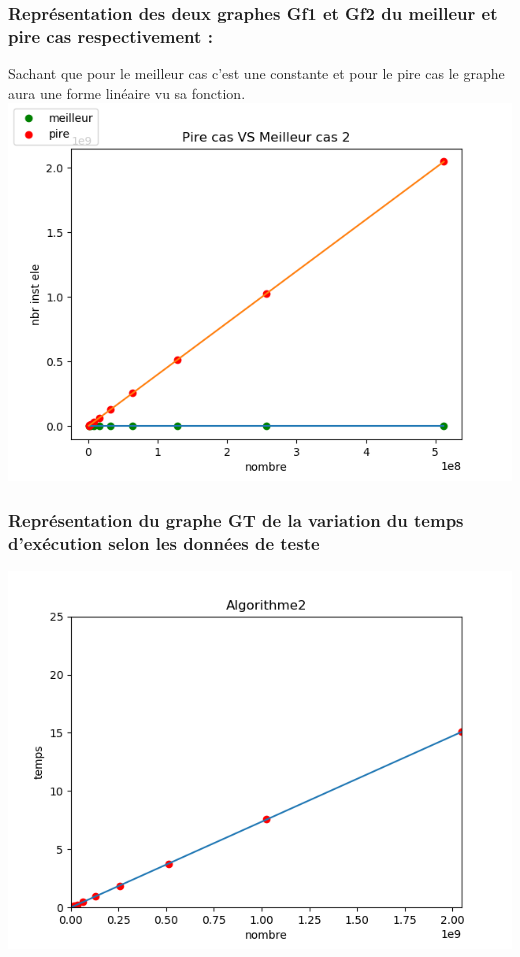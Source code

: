 \documentclass[12pt]{article}
\begin{document}
\subsubsection{Représentation des deux graphes Gf1 et Gf2 du meilleur et pire cas respectivement :}
Sachant que pour le meilleur cas c'est une constante et pour le pire cas le graphe aura une forme linéaire vu sa fonction.
\\
\includegraphics[width=1\textwidth]{graphe/Pire_VS_Meilleur_cas2.png}

\subsubsection{Représentation du graphe GT de la variation du temps d'exécution selon les données de teste}

\includegraphics[width=1\textwidth]{graphe/Algorithme2.png}
\end{document}
